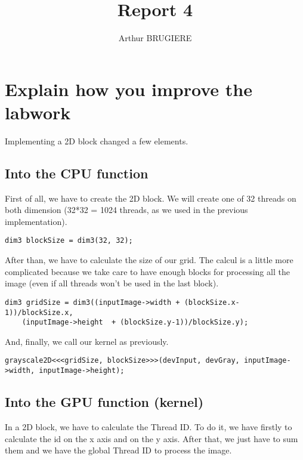 \documentclass[11pt]{article} %
\title{Report 4}
\author{Arthur BRUGIERE}
\begin{document}
\maketitle

\section{Explain how you improve the labwork}

Implementing a 2D block changed a few elements.

\subsection{Into the CPU function}

First of all, we have to create the 2D block. We will create one of 32 threads on both dimension (32*32 = 1024 threads, as we used in the previous implementation).

\begin{lstlisting}[style=CStyle]
dim3 blockSize = dim3(32, 32);
\end{lstlisting}

After than, we have to calculate the size of our grid. The calcul is a little more complicated because we take care to have enough blocks for processing all the image (even if all threads won't be used in the last block). 

\begin{lstlisting}[style=CStyle]
dim3 gridSize = dim3((inputImage->width + (blockSize.x-1))/blockSize.x, 
    (inputImage->height  + (blockSize.y-1))/blockSize.y);
\end{lstlisting}

And, finally, we call our kernel as previously.

\begin{lstlisting}[style=CStyle]
grayscale2D<<<gridSize, blockSize>>>(devInput, devGray, inputImage->width, inputImage->height);
\end{lstlisting}

\subsection{Into the GPU function (kernel)}

In a 2D block, we have to calculate the Thread ID. To do it, we have firstly to calculate the id on the x axis and on the y axis. After that, we just have to sum them and we have the global Thread ID to process the image. 
\end{document}
